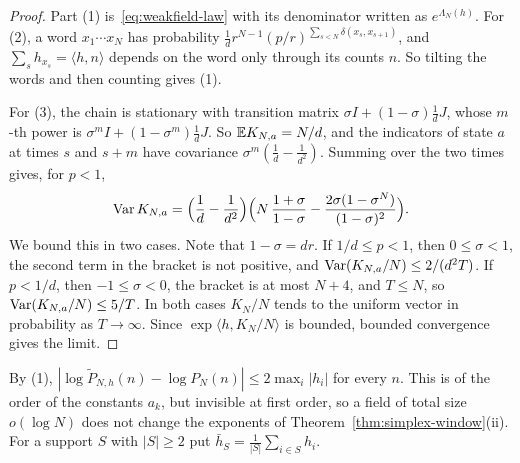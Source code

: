\begin{proof}
Part (1) is~\eqref{eq:weakfield-law} with its denominator written as
$e^{\Lambda_N(h)}$. For (2), a word $x_1\cdots x_N$ has probability
$\frac1dr^{N-1}(p/r)^{\sum_{s<N}\delta(x_s,x_{s+1})}$, and
$\sum_sh_{x_s}=\langle h,n\rangle$ depends on the word only through its counts
$n$. So tilting the words and then counting gives (1).

For (3), the chain is stationary with transition matrix
$\sigma I+(1-\sigma)\frac1dJ$, whose $m$-th power is
$\sigma^mI+(1-\sigma^m)\frac1dJ$. So $\mathbb E K_{N,a}=N/d$, and the indicators of
state $a$ at times $s$ and $s+m$ have covariance $\sigma^m(\frac1d-\frac1{d^2})$.
Summing over the two times gives, for $p<1$,
\[
 \operatorname{Var} K_{N,a}=\Bigl(\frac1d-\frac1{d^2}\Bigr)
 \Bigl(N\,\frac{1+\sigma}{1-\sigma}-\frac{2\sigma(1-\sigma^N)}{(1-\sigma)^2}\Bigr).
\]
We bound this in two cases. Note that $1-\sigma=dr$. If $1/d\le p<1$, then
$0\le\sigma<1$, the second term in the bracket is not positive, and
$\operatorname{Var}(K_{N,a}/N)\le2/(d^2T)$. If $p<1/d$, then $-1\le\sigma<0$, the bracket is
at most $N+4$, and $T\le N$, so $\operatorname{Var}(K_{N,a}/N)\le5/T$. In both cases
$K_N/N$ tends to the uniform vector in probability as $T\to\infty$. Since
$\exp\langle h,K_N/N\rangle$ is bounded, bounded convergence gives the limit.
\end{proof}

By (1), $|\log\widetilde P_{N,h}(n)-\log P_N(n)|\le2\max_i|h_i|$ for every $n$.
This is of the order of the constants $a_k$, but invisible at first order, so
a field of total size $o(\log N)$ does not change the exponents of
Theorem~\ref{thm:simplex-window}(ii). For a support $S$ with $|S|\ge2$ put
$\bar h_S=\frac1{|S|}\sum_{i\in S}h_i$.


